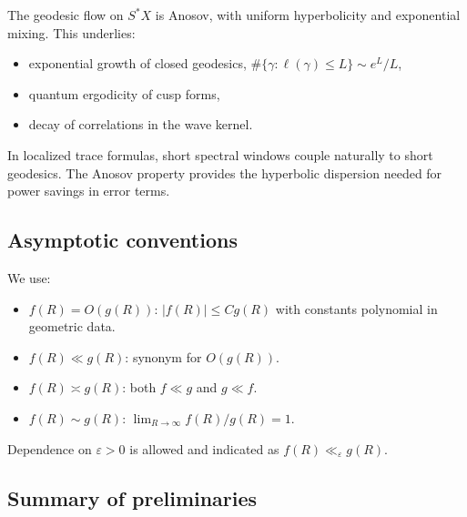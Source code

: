 The geodesic flow on $S^*X$ is Anosov, with uniform hyperbolicity and exponential mixing. This underlies:
\begin{itemize}
  \item exponential growth of closed geodesics, $\#\{\gamma: \ell(\gamma)\le L\}\sim e^L/L$,
  \item quantum ergodicity of cusp forms,
  \item decay of correlations in the wave kernel.
\end{itemize}

In localized trace formulas, short spectral windows couple naturally to short geodesics. The Anosov property provides the hyperbolic dispersion needed for power savings in error terms.

\subsection{Asymptotic conventions}\label{subsec:asymptotics}

We use:
\begin{itemize}
  \item $f(R)=O(g(R))$: $|f(R)|\le C g(R)$ with constants polynomial in geometric data.
  \item $f(R)\ll g(R)$: synonym for $O(g(R))$.
  \item $f(R)\asymp g(R)$: both $f\ll g$ and $g\ll f$.
  \item $f(R)\sim g(R)$: $\lim_{R\to\infty} f(R)/g(R)=1$.
\end{itemize}

Dependence on $\varepsilon>0$ is allowed and indicated as $f(R)\ll_\varepsilon g(R)$.

\subsection{Summary of preliminaries}\label{subsec:prelim-summary}

